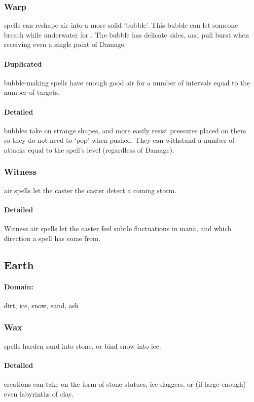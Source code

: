 \begin{multicols}{2}
\subsubsection{Warp}
spells can reshape air into a more solid `bubble'.
This bubble can let someone breath while underwater for .
The bubble has delicate sides, and pull burst when receiving even a single point of Damage.

\paragraph{Duplicated}
bubble-making spells have enough good air for a number of \glspl{interval} equal to the number of targets.

\paragraph{Detailed}
bubbles take on strange shapes, and more easily resist pressures placed on them so they do not need to `pop' when pushed.
They can withstand a number of attacks equal to the spell's level (regardless of Damage).

\subsubsection{Witness}
air spells let the caster the caster detect a coming storm.

\paragraph{Detailed}
Witness air spells let the caster feel subtle fluctuations in mana, and which direction a spell has come from.

\subsection{Earth}
\paragraph{Domain:}
dirt, ice, snow, sand, ash

\subsubsection{Wax}
spells harden sand into stone, or bind snow into ice.

\paragraph{Detailed}
creations can take on the form of stone-statues, ice-daggers, or (if large enough) even labyrinths of clay.


\end{multicols}
